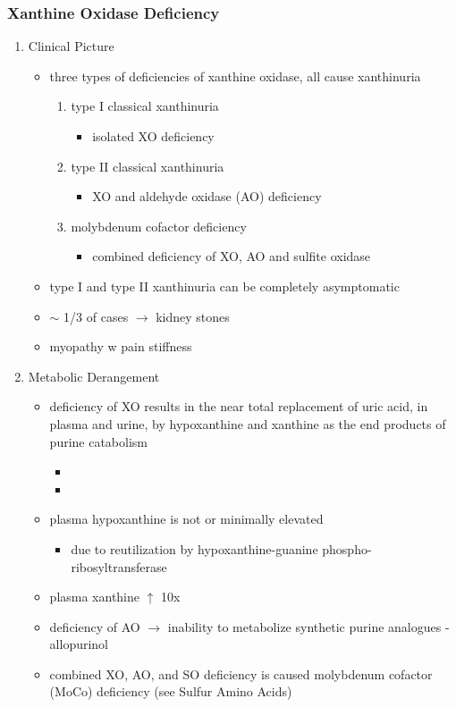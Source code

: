 \documentclass{scrartcl}
\begin{document}
\subsubsection{Xanthine Oxidase Deficiency}
\label{sec:org673c3d1}
\begin{enumerate}
\item Clinical Picture
\label{sec:org6861cde}
\begin{itemize}
\item three types of deficiencies of xanthine oxidase, all cause
xanthinuria
\begin{enumerate}
\item type I classical xanthinuria
\begin{itemize}
\item isolated XO deficiency
\end{itemize}
\item type II classical xanthinuria
\begin{itemize}
\item XO and aldehyde oxidase (AO) deficiency
\end{itemize}
\item molybdenum cofactor deficiency
\begin{itemize}
\item combined deficiency of XO, AO and sulfite oxidase
\end{itemize}
\end{enumerate}
\item type I and type II xanthinuria can be completely asymptomatic
\item \(\sim\) 1/3 of cases \(\to\) kidney stones
\item myopathy w pain stiffness
\end{itemize}

\item Metabolic Derangement
\label{sec:org0ff0951}
\begin{itemize}
\item deficiency of XO results in the near total replacement of uric acid,
in plasma and urine, by hypoxanthine and xanthine as the end
products of purine catabolism
\begin{itemize}
\item {}
\item {}
\end{itemize}
\item plasma hypoxanthine is not or minimally elevated
\begin{itemize}
\item due to reutilization by hypoxanthine-guanine phospho-ribosyltransferase
\end{itemize}
\item plasma xanthine \(\uparrow\) 10x
\item deficiency of AO \(\to\) inability to metabolize synthetic purine
analogues - allopurinol
\item combined XO, AO, and SO deficiency is caused molybdenum cofactor
(MoCo) deficiency (see Sulfur Amino Acids)
\end{itemize}


\end{enumerate}
\end{document}

